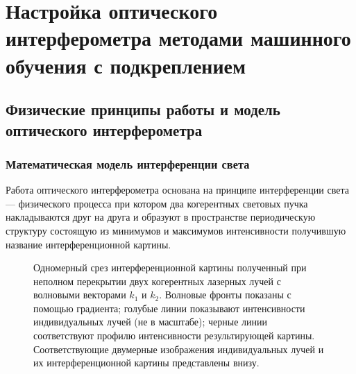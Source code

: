 \chapter{Настройка оптического интерферометра методами машинного обучения с подкреплением}\label{ch:ch2}

\section{Физические принципы работы и модель оптического интерферометра}\label{sec:ch2/sec1}

\subsection{Математическая модель интерференции света}\label{sec:ch2/sec1/subsec1}

Работа оптического интерферометра основана на принципе интерференции света --- физического процесса при котором два когерентных световых пучка накладываются друг на друга и образуют в пространстве периодическую структуру состоящую из минимумов и максимумов интенсивности получившую название интерференционной картины. 

\begin{figure}[ht]
    \caption{Одномерный срез интерференционной картины полученный при неполном перекрытии двух когерентных лазерных лучей с волновыми векторами $k_1$ и $k_2$. Волновые фронты показаны с помощью градиента; голубые линии показывают интенсивности индивидуальных лучей (не в масштабе); черные линии соответствуют профилю интенсивности результирующей картины. Соответствующие двумерные изображения индивидуальных лучей и их интерференционной картины представлены внизу.}\label{fig:two_beam_interf}
\end{figure}


